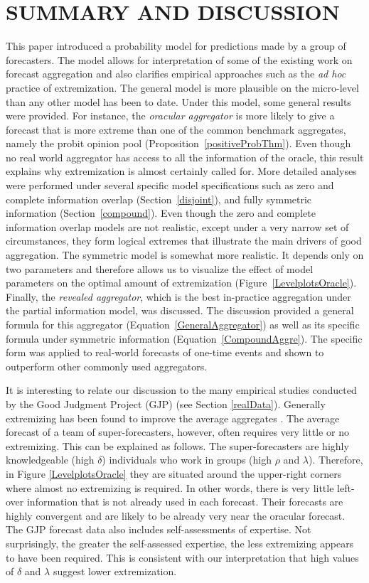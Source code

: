 \documentclass[12pt]{article}
\theoremstyle{definition}
\theoremstyle{definition}
\begin{document}
\section{SUMMARY AND DISCUSSION}
\label{discussion}
This paper introduced a probability model for predictions made by
a group of forecasters.  The model allows for interpretation of some
of the existing work on forecast aggregation and also clarifies
empirical approaches such as the {\em ad hoc} practice of
extremization.  The general model is more plausible on the micro-level
than any other model has been to date. Under this model, 
some general results were provided. For instance, the
\textit{oracular aggregator} is more likely to give a forecast that is
more extreme than one of the common benchmark aggregates, namely the
probit opinion pool (Proposition~\ref{positiveProbThm}).  Even though
no real world aggregator has access to all the information of the
oracle, this result explains why extremization is almost certainly
called for.  More detailed analyses  were performed under several
specific model specifications such as zero and complete information
overlap (Section~\ref{disjoint}), and fully symmetric information (Section~\ref{compound}).  Even though the zero and complete
information overlap models are not realistic, except under a very
narrow set of circumstances, they form logical extremes that illustrate the main drivers of good aggregation. The symmetric model is somewhat
more realistic. It depends only on two parameters and therefore allows us to visualize the effect of model parameters on the optimal amount of
extremization (Figure~\ref{LevelplotsOracle}).  Finally, the
{\em revealed aggregator}, which is the best in-practice aggregation
under the partial information model, was discussed. The discussion provided a general formula for
this aggregator (Equation~\ref{GeneralAggregator}) as well as its
specific formula under symmetric information
(Equation~\ref{CompoundAggre}). The specific form was applied to real-world forecasts 
of one-time events and shown to 
outperform other commonly used aggregators. 

It is interesting to relate our discussion to the many empirical
studies conducted by the Good Judgment Project (GJP) (see Section
\ref{realData}).  Generally
extremizing has been found to improve the average aggregates
\citep{mellers2014psychological, satopaa, satopaa2014probability}.
The average forecast of a team of super-forecasters, however, often
requires very little or no extremizing.  This can be explained as follows.  The super-forecasters are
highly knowledgeable (high $\delta$) individuals who work
 in groups (high $\rho$ and $\lambda$).  Therefore, in
Figure \ref{LevelplotsOracle} they are situated around the upper-right
corners where almost no extremizing is required.  In other words,
there is very little left-over information that is not already used in each
forecast.  Their forecasts are highly convergent and are likely to be
already very near the oracular forecast.  The GJP forecast data also
includes self-assessments of expertise.  Not surprisingly, the greater
the self-assessed expertise, the less extremizing appears to have been
required. This is consistent with our interpretation that high values
of $\delta$ and $\lambda$ suggest lower extremization.
\end{document}
